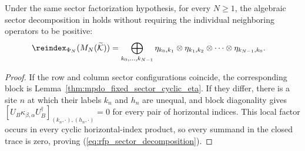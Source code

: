 \begin{lemma}
    \label{thm:mpdo_sector_adapted_decomposition}
    \leanok
    Under the same sector factorization hypothesis, for every $N\geq1$, the
    algebraic sector decomposition in
    \cite[Appendix~C.2, lines~1446--1450]{Cirac2016MPDO_arXiv} holds without
    requiring the individual neighboring operators to be positive:
    \begin{align}
        \reindex_{\Phi_N}
        (M_N(\widetilde{\cal K}))
         & =\bigoplus_{k_0,\ldots,k_{N-1}}
        \eta_{k_0,k_1}\otimes\eta_{k_1,k_2}\otimes\cdots\otimes
        \eta_{k_{N-1},k_0}.
        \label{eq:rfp_sector_decomposition}
    \end{align}
\end{lemma}

\begin{proof}
    \leanok
    If the row and column sector configurations coincide, the corresponding
    block is Lemma~\ref{thm:mpdo_fixed_sector_cyclic_eta}. If they differ,
    there is a site $n$ at which their labels $k_n$ and $h_n$ are unequal, and
    block diagonality gives
    $[U_B\kappa_{\beta,\alpha}U_B^\dagger]
            _{(k_n, \cdot),(h_n, \cdot)}=0$ for every pair of horizontal indices.
    This local factor occurs in every cyclic horizontal-index product, so
    every summand in the closed trace is zero, proving
    (\ref{eq:rfp_sector_decomposition}).
\end{proof}
